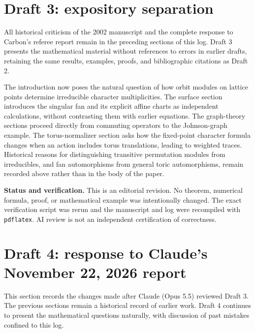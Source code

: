 \documentclass[12pt,letterpaper]{article}
\begin{document}
\section{Draft 3: expository separation}
All historical criticism of the 2002 manuscript and the complete response to Carbon's
referee report remain in the preceding sections of this log. Draft 3 presents the
mathematical material without references to errors in earlier drafts, retaining
the same results, examples, proofs, and bibliographic citations as Draft 2.

The introduction now poses the natural question of how orbit modules on lattice
points determine irreducible character multiplicities. The surface section
introduces the singular fan and its explicit affine charts as independent
calculations, without contrasting them with earlier equations. The graph-theory
sections proceed directly from commuting operators to the Johnson-graph
example. The torus-normalizer section asks how the fixed-point character formula
changes when an action includes torus translations, leading to weighted traces.
Historical reasons for distinguishing transitive permutation modules from
irreducibles, and fan automorphisms from general toric automorphisms, remain
recorded above rather than in the body of the paper.

\noindent\textbf{Status and verification.} This is an editorial revision.
No theorem, numerical formula, proof, or mathematical example was intentionally
changed. The exact verification script was rerun and the manuscript and log
were recompiled with \texttt{pdflatex}. AI review is not an independent
certification of correctness.


\section{Draft 4: response to Claude's November 22, 2026 report}
This section records the changes made after Claude (Opus 5.5) reviewed Draft 3.
The previous sections remain a historical record of earlier work. Draft 4
continues to present the mathematical questions naturally, with discussion
of past mistakes confined to this log.
\end{document}
